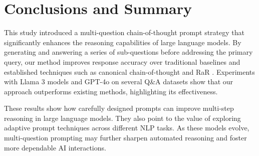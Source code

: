 \section{Conclusions and Summary}
\label{sec:conclusions-summary}

This study introduced a multi-question chain-of-thought prompt strategy that significantly enhances the reasoning capabilities of large language models. By generating and answering a series of sub-questions before addressing the primary query, our method improves response accuracy over traditional baselines and established techniques such as canonical chain-of-thought and RaR \cite{dengRephraseRespondLet2024}. Experiments with Llama 3 models and GPT-4o on several Q\&A datasets show that our approach outperforms existing methods, highlighting its effectiveness.

These results show how carefully designed prompts can improve multi-step reasoning in large language models. They also point to the value of exploring adaptive prompt techniques across different NLP tasks. As these models evolve, multi-question prompting may further sharpen automated reasoning and foster more dependable AI interactions.

